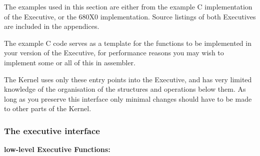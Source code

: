 The examples used in this section are either from the example C implementation
of the Executive, or the 680X0 implementation. Source listings of both
Executives are included in the appendices.

The example C code serves as a template for the functions to be implemented
in your version of the Executive, for performance reasons you may
wish to implement some or all of this in assembler.

The Kernel uses only these entry points into the Executive, and has very limited
knowledge of the organisation of the structures and operations below them.
As long as you preserve this interface only minimal changes should have to
be made to other parts of the Kernel.

\subsubsection{The executive interface}

{\bf low-level Executive Functions:}
\vspace{0.25cm}

